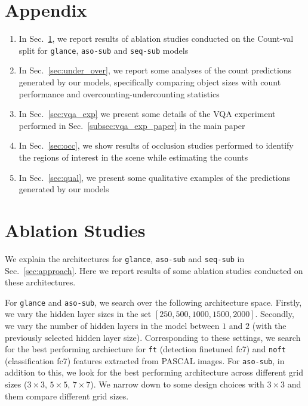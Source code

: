 \documentclass[10pt,twocolumn,letterpaper]{article}
\newcommand{\sub}{\texttt{aso-sub}\xspace}
\newcommand{\seq}{\texttt{seq-sub}\xspace}
\newcommand{\glance}{\texttt{glance}\xspace}
\newcommand{\refsec}[1]{Sec.~\ref{#1}}
\begin{document}
{\small


}

\clearpage
\section*{Appendix}\label{sec:appendix}
\setcounter{section}{0}
\normalsize
\newenvironment{packed_itemize}{
\begin{enumerate}{\labelitemi}{\leftmargin=2em}
\vspace{-6pt}
 \setlength{\itemsep}{0pt}
 \setlength{\parskip}{0pt}
 \setlength{\parsep}{0pt}
}
{\end{enumerate}}

\begin{enumerate}
\itemsep0em
\item In \refsec{sec:abl}, we report results of ablation studies conducted on the Count-val split for \glance, \sub and \seq models
\item In \refsec{sec:under_over}, we report some analyses of the count predictions generated by our models, specifically comparing object sizes with count performance and overcounting-undercounting statistics
\item In \refsec{sec:vqa_exp} we present some details of the VQA experiment performed in \refsec{subsec:vqa_exp_paper} in the main paper
\item In \refsec{sec:occ}, we show results of occlusion studies performed to identify the regions of interest in the scene while estimating the counts
\item In \refsec{sec:qual}, we present some qualitative examples of the predictions generated by our models
\end{enumerate}

\section{Ablation Studies}\label{sec:abl}
We explain the architectures for \glance, \sub and \seq in \refsec{sec:approach}. Here we report results of some ablation studies conducted on these architectures.

For \glance and \sub, we search over the following architecture space. Firstly, we vary the hidden layer sizes in the set $[250, 500, 1000, 1500, 2000]$. Secondly, we vary the number of hidden layers in the model between $1$ and $2$ (with the previously selected hidden layer size). Corresponding to these settings, we search for the best performing archiecture for \texttt{ft} (detection finetuned fc7) and \texttt{noft} (classification fc7) features extracted from PASCAL images. For \sub, in addition to this, we look for the best performing architecture across different grid sizes ($3\times3$, $5\times5$, $7\times7$). We narrow down to some design choices with $3\times3$ and them compare different grid sizes.
\end{document}
